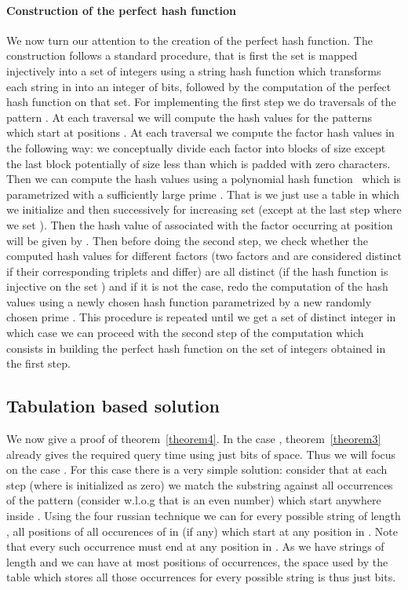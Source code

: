 \documentclass{article}
\newcommand{\?}{\mskip1.5mu}
\begin{document}
\paragraph{Construction of the perfect hash function}
We now turn our attention to the creation of the perfect hash function. The construction follows a standard procedure, that is first the set  is mapped injectively into a set of integers using a string hash function which transforms each string in  into an integer of  bits, followed by the computation of the perfect hash function on that set. For implementing the first step we do  traversals of the pattern . At each traversal  we will compute the hash values for the patterns which start at positions .  
At each traversal we compute the factor hash values in the following way: we conceptually divide each factor into blocks of size  except the last block potentially of size less than  which is padded with zero characters. Then we can compute the hash values using a polynomial hash function~\cite[section 5]{DGMP}  which is parametrized with a sufficiently large prime . That is we just use a table  in which we initialize  and then successively for increasing  set  (except at the last step where we set ). Then the hash value of associated with the factor occurring at position  will be given by . 
Then before doing the second step, we check whether the computed hash values for different factors (two factors  and  are considered distinct if their corresponding triplets  and  differ) are all distinct (if the hash function  is injective on the set ) and if it is not the case, redo the computation of the hash values using a newly chosen hash function  parametrized by a new randomly chosen prime . This procedure is repeated until we get a set of  distinct integer in which case we can proceed with the second step of the computation which consists in building the perfect hash function on the set of integers obtained in the first step. 
\subsection{Tabulation based solution}
We now give a proof of theorem~\ref{theorem4}. In the case , theorem~\ref{theorem3} already gives the required query time using just  bits of space. Thus we will focus on the case . For this case there is a very simple solution: consider that at each step  (where  is initialized as zero) we match the substring  against all occurrences of the pattern  (consider w.l.o.g that  is an even number) which start anywhere inside . Using the four russian technique we can for every possible string  of length , all positions of all occurences of  in  (if any) which start at any position in . Note that every such occurrence must end at any position in . As we have  strings of length  and we can have at most  positions of occurrences, the space used by the table which stores all those occurrences for every possible string is thus just  bits. 
\end{document}
